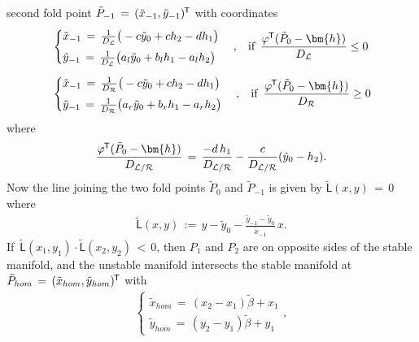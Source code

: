 \documentclass{article}
\theoremstyle{example}
\theoremstyle{plain}
\theoremstyle{definition}
\theoremstyle{remark}
\def\vh{{\bm{h}}}
\newcommand*{\tran}{^{\mkern-1.5mu\mathsf{T}}}
\begin{document}
second fold point $\tilde{P}_{-1} \, = \,(\tilde{x}_{-1}, \tilde{y}_{-1})\tran$
with coordinates 
\begin{align}\nonumber
& \begin{cases}
\tilde{x}_{-1}\, = \, \frac{1}{D_{\mathcal{L}}}\big( -c \tilde{y}_0 + c h_2-d h_1\big)
\\[1ex]
\tilde{y}_{-1} \, = \, \frac{1}{D_{\mathcal{L}}}\big( a_l \tilde{y}_0 + b_l h_1 - a_l h_2\big)
\end{cases}, \hspace{.3cm} \text{if} \, \, \,  \frac{\varphi\tran(\tilde{P}_0-\vh)}{D_{\mathcal{L}}}  \leq 0
%
\\[1ex]
& \begin{cases}
\tilde{x}_{-1}\, = \,\frac{1}{D_{\mathcal{R}}}\big( -c \tilde{y}_0 + c h_2-d h_1\big)
\\[1ex]
\tilde{y}_{-1} \, = \, \frac{1}{D_{\mathcal{R}}}\big( a_r \tilde{y}_0 + b_r h_1 - a_r h_2\big)
\end{cases}, \hspace{.3cm} \text{if} \, \, \, \frac{\varphi\tran(\tilde{P}_0-\vh)}{D_{\mathcal{R}}} \geq 0
\end{align}
where
\begin{align}
\frac{\varphi\tran(\tilde{P}_0-\vh)}{D_{\mathcal{L}/\mathcal{R}}}\, = \,\frac{- d\, h_1}{D_{\mathcal{L}/\mathcal{R}}}-\frac{c}{D_{\mathcal{L}/\mathcal{R}}}(\tilde{y}_0-h_2). 
\end{align}
Now the line joining the two fold points $\tilde{P}_0$ and $\tilde{P}_{-1}$ is given by $ \tilde{\mathsf{L}}(x,y) \, = \,0$ where
\begin{align}\label{}
 \tilde{\mathsf{L}}(x,y) \,:= \, y-\tilde{y}_0 - \frac{\tilde{y}_{-1}-\tilde{y}_0}{\tilde{x}_{-1}} \, x.
\end{align}
If $\,\tilde{\mathsf{L}}(x_1,y_1)  \cdot  \tilde{\mathsf{L}}(x_2,y_2) \, < \,  0$, 
then $P_{1}$ and $P_{2}$ are on opposite sides of the stable manifold, and the unstable manifold intersects the stable manifold at $\tilde{P}_{hom}\, = \, (\tilde{x}_{hom}, \tilde{y}_{hom})\tran$ with
\begin{align}
 \begin{cases}
 \tilde{x}_{hom}\, =\, (x_2-x_1)\tilde{\beta} +x_1
 \\[1ex]
 \tilde{y}_{hom}\, =\, (y_2-y_1)\tilde{\beta} +y_1
 \end{cases},   
\end{align}
\end{document}

